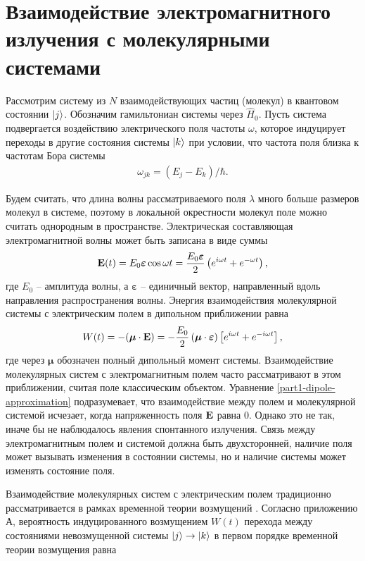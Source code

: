 \section{Взаимодействие электромагнитного излучения с молекулярными системами}
Рассмотрим систему из $N$ взаимодействующих частиц (молекул) в квантовом состоянии $\ket{j}$. Обозначим гамильтониан системы через $\hat{H}_0$. Пусть система подвергается воздействию электрического поля частоты $\omega$, которое индуцирует переходы в другие состояния системы $\ket{k}$ при условии, что частота поля близка к частотам Бора системы
%
\begin{gather}
    \omega_{jk} = (E_j - E_k) / \hbar.
\end{gather}

Будем считать, что длина волны рассматриваемого поля $\lambda$ много больше размеров молекул в системе, поэтому в локальной окрестности молекул поле можно считать однородным в пространстве.  Электрическая составляющая электромагнитной волны может быть записана в виде суммы
%
\begin{gather}
    \mathbf{E}(t) = E_0 \boldsymbol{\varepsilon} \cos \omega t = \frac{E_0 \boldsymbol{\varepsilon}}{2} \left( e^{i \omega t} + e^{- \omega t} \right),
\end{gather}
%
где $E_0$ -- амплитуда волны, а $\boldsymbol{\varepsilon}$ -- единичный вектор, направленный вдоль направления распространения волны. Энергия взаимодействия молекулярной системы с электрическим полем в дипольном приближении равна
%
\begin{gather}
    W(t) = - (\boldsymbol{\mu} \cdot \mathbf{E}) = - \frac{E_0}{2} \left( \boldsymbol{\mu} \cdot \boldsymbol{\varepsilon} \right) \left[ e^{i \omega t} + e^{-i \omega t} \right], \label{part1-dipole-approximation} 
\end{gather}
%
где через $\boldsymbol{\mu}$ обозначен полный дипольный момент системы. Взаимодействие молекулярных систем с электромагнитным полем часто рассматривают в этом приближении, считая поле классическим объектом. Уравнение \eqref{part1-dipole-approximation} подразумевает, что взаимодействие между полем и молекулярной системой исчезает, когда напряженность поля $\mathbf{E}$ равна 0. Однако это не так, иначе бы не наблюдалось явления спонтанного излучения. Связь между электромагнитным полем и системой должна быть двухсторонней, наличие поля может вызывать изменения в состоянии системы, но и наличие системы может изменять состояние поля. \par  
Взаимодействие молекулярных систем с электрическим полем традиционно рассматривается в рамках временной теории возмущений \cite{cohentanuji, greiner}. Согласно приложению А, вероятность индуцированного возмущением $W(t)$ перехода между состояниями невозмущенной системы $\ket{j} \rightarrow \ket{k}$ в первом порядке временной теории возмущения равна
